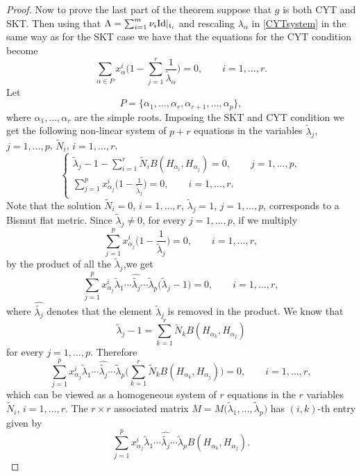 \documentclass[10pt,a4paper]{amsart}
\numberwithin{equation}{section}
\begin{document}
\begin{proof}
Now to prove the last part of the theorem suppose that $g$ is both CYT and SKT. Then using that $\Lambda = \sum_{i =1}^m \nu_i {\rm Id} |_{\mathfrak t_i}$ and rescaling $\lambda_{\alpha}$ in \eqref{CYTsystem} in the same way as for the SKT case we have that the equations for the CYT condition become
\[
\sum_{\alpha \in P} x_\alpha^i\Bigg(1 - \sum_{j =1}^r \frac{1}{\tilde \lambda_{\alpha}} \Bigg) = 0, \qquad i = 1, \dots ,r.
\]
Let
\[
P = \{ \alpha_1, \dots, \alpha_r, \alpha_{r + 1}, \dots, \alpha_p \},
\]
where $\alpha_1, \dots, \alpha_r$ are the simple roots.
Imposing the SKT and CYT condition we get the following non-linear system of $p + r$ equations in the variables $\tilde \lambda_{j}$, $j =1, \dots, p$, $\tilde N_i$, $i = 1, \dots, r$,
\begin{equation}\label{newsystem}
 \begin{cases}
\displaystyle \tilde \lambda_{j}-1 - \sum_{i = 1}^r \tilde N_i B(H_{\alpha_i}, H_{\alpha_j})=0, \qquad j = 1, \dots, p,\\
\displaystyle \sum_{j=1}^p x_{\alpha_j}^i \bigg(1 - \frac{1}{\tilde \lambda_{j}} \bigg) =0, \qquad i = 1, \dots, r.
\end{cases}
\end{equation}
Note that the solution $\tilde N_i =0$, $i=1, \dots, r$, $\tilde \lambda_j = 1$, $j = 1, \dots, p$, corresponds to a Bismut flat metric.
Since $ \tilde \lambda_j \neq 0$, for every $j = 1, \dots, p$, if we multiply
\[
\sum_{j=1}^p x_{\alpha_j}^i \bigg(1 - \frac{1}{\tilde \lambda_{j}} \bigg) =0, \qquad i = 1, \dots, r,
\]
by the product of all the $\tilde \lambda_j$,we get
\[
\sum_{j=1}^p x_{\alpha_j}^i \tilde \lambda_1 \cdots \hat{\tilde {\lambda_j}} \cdots \tilde \lambda _p \big(\tilde \lambda_j - 1\big) =0, \qquad i = 1, \dots, r,
\]
where $\hat{ \tilde {\lambda_{j} }}$ denotes that the element $\tilde \lambda_{j}$ is removed in the product. We know that
\[
\tilde \lambda_{j}-1 = \sum_{k = 1}^r \tilde N_k B(H_{\alpha_k}, H_{\alpha_j})
\]
for every $j = 1, \dots, p$. Therefore
\[
\sum_{j=1}^p x_{\alpha_j}^i \tilde \lambda_1 \cdots \hat{\tilde {\lambda_j}} \cdots \tilde \lambda _p \Bigg (\sum_{k = 1}^r \tilde N_k B(H_{\alpha_k}, H_{\alpha_j})\Bigg)=0, \qquad i = 1, \dots, r,
\]
 which can be viewed as a homogeneous system of $r$ equations in the $r$ variables $\tilde N_i$, $i = 1, \dots, r$. The $r \times r$ associated matrix $M = M\big(\tilde \lambda_1, \dots, \tilde \lambda_p\big)$ has $(i,k)$-th entry given by
\[
\sum_{j=1}^p x_{\alpha_j}^i \tilde \lambda_1 \cdots \hat{\tilde {\lambda_j}} \cdots \tilde \lambda _p B(H_{\alpha_k}, H_{\alpha_j}).
\]
\end{proof}
\end{document}
